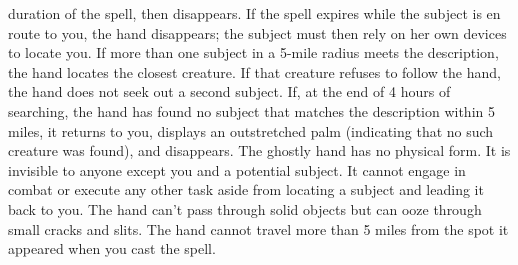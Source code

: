 duration of the spell, then disappears. If the spell expires while the subject
is en route to you, the hand disappears; the subject must then rely on her own
devices to locate you.
If more than one subject in a 5-mile radius meets the description, the hand locates
the closest creature. If that creature refuses to follow the hand, the hand does
not seek out a second subject.
If, at the end of 4 hours of searching, the hand has found no subject that matches
the description within 5 miles, it returns to you, displays an outstretched palm
(indicating that no such creature was found), and disappears.
The ghostly hand has no physical form. It is invisible to anyone except you and
a potential subject. It cannot engage in combat or execute any other task aside
from locating a subject and leading it back to you. The hand can't pass through
solid objects but can ooze through small cracks and slits. The hand cannot travel
more than 5 miles from the spot it appeared when you cast the spell.